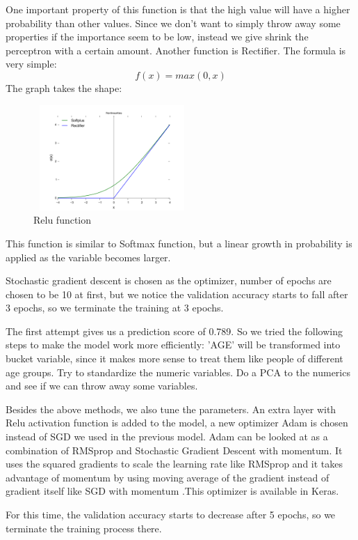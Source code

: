 \documentclass{article}
\begin{document}
One important property of this function is that the high value will have a higher probability than other values. Since we don’t want to simply throw away some properties if the importance seem to be low, instead we give shrink the perceptron with a certain amount. 
Another function is Rectifier. The formula is very simple:
\begin{equation}
f(x)=max(0,x)
\end{equation}
 The graph takes the shape:
 \begin{figure}[h]
 \centering
 \includegraphics[width=6cm, height=4cm]{relu.png}
 \caption{Relu function}
\end{figure}

This function is similar to Softmax function, but a linear growth in probability is applied as the variable becomes larger.

Stochastic gradient descent is chosen as the optimizer, number of epochs are chosen to be 10 at first, but we notice the validation accuracy starts to fall after 3 epochs, so we terminate the training at 3 epochs. 

The first attempt gives us a prediction score of 0.789. So we tried the following steps to make the model work more efficiently:
'AGE' will be transformed into bucket variable, since it makes more sense to treat them like people of different age groups.
Try to standardize the numeric variables.
Do a PCA to the numerics and see if we can throw away some variables.

Besides the above methods, we also tune the parameters. An extra layer with Relu activation function is added to the model, a new optimizer Adam is chosen instead of SGD we used in the previous model. Adam can be looked at as a combination of RMSprop and Stochastic Gradient Descent with momentum. It uses the squared gradients to scale the learning rate like RMSprop and it takes advantage of momentum by using moving average of the gradient instead of gradient itself like SGD with momentum\cite{adam} .This optimizer is available in Keras\cite{optimizer}.

For this time, the validation accuracy starts to decrease after 5 epochs, so we terminate the training process there.
\end{document}
